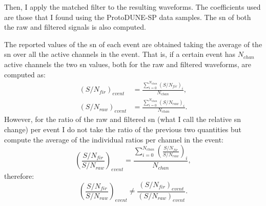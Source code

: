 Then, I apply the matched filter to the resulting waveforms. The coefficients used are those that I found using the ProtoDUNE-SP data samples. The \gls{sn} of both the raw and filtered signals is also computed.

The reported values of the \gls{sn} of each event are obtained taking the average of the \gls{sn} over all the active channels in the event. That is, if a certain event has $N_{chan}$ active channels the two \gls{sn} values, both for the raw and filtered waveforms, are computed as:
\begin{equation}
\begin{split}
\left(S/N_{fir}\right)_{event} &= \frac{\sum_{i=0}^{N_{chan}} \left(S/N_{fir}\right)_{i}}{N_{chan}},\\
\left(S/N_{raw}\right)_{event} &= \frac{\sum_{i=0}^{N_{chan}} \left(S/N_{raw}\right)_{i}}{N_{chan}}.
\end{split}
\end{equation}
However, for the ratio of the raw and filtered \gls{sn} (what I call the relative \gls{sn} change) per event I do not take the ratio of the previous two quantities but compute the average of the individual ratios per channel in the event:
\begin{equation}
\left(\frac{S/N_{fir}}{S/N_{raw}}\right)_{event} = \frac{\sum_{i=0}^{N_{chan}} \left(\frac{S/N_{fir}}{S/N_{raw}}\right)_{i}}{N_{chan}},
\end{equation}
therefore:
\begin{equation}
\left(\frac{S/N_{fir}}{S/N_{raw}}\right)_{event}  \neq \frac{\left(S/N_{fir}\right)_{event}}{\left(S/N_{raw}\right)_{event}}.
\end{equation}

